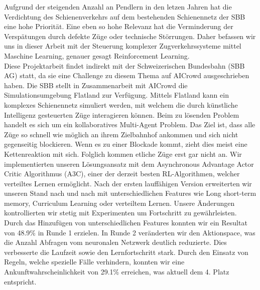 Aufgrund der steigenden Anzahl an Pendlern in den letzen Jahren hat die Verdichtung des Schienenverkehrs auf dem bestehenden Schienennetz der SBB eine hohe Priorität.
Eine eben so hohe Relevanz hat die Verminderung der Verspätungen durch defekte Züge oder technische Störrungen.
Daher befassen wir uns in dieser Arbeit mit der Steuerung komplexer Zugverkehrssysteme mittel Maschine Learning, genauer gesagt Reinforcement Learning.\\
Diese Projektarbeit findet indirekt mit der Schweizerischen Bundesbahn (SBB AG) statt, da sie eine Challenge zu diesem Thema auf AICrowd ausgeschrieben haben.
Die SBB stellt in Zusammenarbeit mit AICrowd die Simulationsumgebung Flatland zur Verfügung. Mittels Flatland kann ein komplexes Schienennetz simuliert werden, mit welchem die durch künstliche Intelligenz gesteuerten Züge interagieren können.
Beim zu lösenden Problem handelt es sich um ein kollaboratives Multi-Agent Problem. Das Ziel ist, dass alle Züge so schnell wie möglich an ihrem Zielbahnhof ankommen und sich nicht gegenseitig blockieren. Wenn es zu einer Blockade kommt, zieht dies meist eine Kettenreaktion mit sich. Folglich kommen etliche Züge erst gar nicht an.
Wir implementierten unseren Lösungsansatz mit dem Asynchronous Advantage Actor Critic Algorithmus (A3C), einer der derzeit besten RL-Algorithmen, welcher verteiltes Lernen ermöglicht.
Nach der ersten lauffähigen Version erweiterten wir unseren Stand nach und nach mit unterschiedlichen Features wie Long short-term memory, Curriculum Learning oder verteiltem Lernen.
Unsere Änderungen kontrollierten wir stetig mit Experimenten um Fortschritt zu gewährleisten.
Durch das Hinzufügen von unterschiedlichen Features konnten wir ein Resultat von 48.9\% in Runde 1 erzielen.
In Runde 2 veränderten wir den Aktionspace, was die Anzahl Abfragen vom neuronalen Netzwerk deutlich reduzierte. Dies verbesserte die Laufzeit sowie den Lernfortschritt stark.
Durch den Einsatz von Regeln, welche spezielle Fälle verhindern, konnten wir eine Ankunftwahrscheinlichkeit von 29.1\% erreichen, was aktuell dem 4. Platz entspricht.

